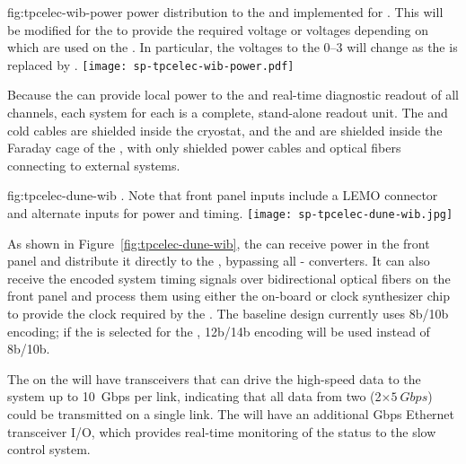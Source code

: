 \begin{dunefigure}
{fig:tpcelec-wib-power}
{ power distribution to the  and  
implemented for . This will be modified for the 
 to provide the required voltage or voltages 
depending on which  are used on the . 
In particular, the voltages to the  \numrange{0}{3} 
will change as the   is replaced by . }
\texttt{[image: sp-tpcelec-wib-power.pdf]}
\end{dunefigure}

Because the  can provide local power to the  
and real-time diagnostic readout of all channels, each  
system for each  is a complete, stand-alone readout unit. 
The  and cold cables are shielded inside the cryostat, 
and the  and  are shielded inside the Faraday 
cage of the , with only shielded power 
cables and optical fibers connecting to external systems.

\begin{dunefigure}
{fig:tpcelec-dune-wib}
{. Note that front panel inputs include 
a LEMO connector and alternate inputs for  power and timing.}
\texttt{[image: sp-tpcelec-dune-wib.jpg]}
\end{dunefigure}

As shown in Figure~\ref{fig:tpcelec-dune-wib}, the  can 
receive  power in the front panel and distribute it directly 
to the , bypassing all - converters.
It can also receive the encoded system timing signals over bidirectional 
optical fibers on the front panel and process them using either
the on-board  or clock synthesizer chip to provide the 
clock required by the . The baseline  design 
currently uses 8b/10b encoding; if the   
 is selected for the  , 
12b/14b encoding will be used instead of 8b/10b.

The  on the  will have transceivers that can 
drive the high-speed data to the  system up to
\SI{10}{Gbps} per link, indicating that all data from
two  (2$\times\SI{5}{Gbps}$) could be transmitted 
on a single link. The  will have an additional 
Gbps Ethernet transceiver I/O, which 
provides real-time monitoring of the  status to the slow control system.

